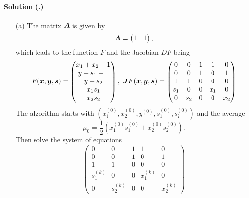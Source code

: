 \documentclass{article}
\newcounter{problemSheetNumber}
\newcounter{problems}
\renewcommand{\solution}[1]{\paragraph{Solution (\theproblemSheetNumber.\theproblems)}\addtocounter{problems}{1}\label{#1}}
\begin{document}
\solution{pr:2} \begin{itemize} \item[(a)] The matrix $\bm{A}$ is given by
\begin{equation*}
 \bm{A} = \begin{pmatrix} 1 & 1 \end{pmatrix},
\end{equation*}
which leads to the function $F$ and the Jacobian $DF$ being
\begin{equation*}
 F(\vct{x},\vct{y},\vct{s}) = \begin{pmatrix}
                               x_1+x_2-1\\
                               y +s_1-1\\
                               y+s_2\\
                               x_1s_1\\
                               x_2s_2
                              \end{pmatrix}, \ 
 \mtx{J}F(\vct{x},\vct{y},\vct{s}) = \begin{pmatrix} 
                               0 & 0 & 1 & 1 & 0\\
                               0 & 0 & 1 & 0 & 1\\
                               1 & 1 & 0 & 0 & 0\\
                               s_1 & 0 & 0 & x_1 & 0\\
                               0 & s_2 & 0 & 0 & x_2
                              \end{pmatrix}
\end{equation*}
The algorithm starts with $(x_1^{(0)},x_2^{(0)},y^{(0)},s_1^{(0)},s_2^{(0)})$ and the average
\begin{equation*}
 \mu_0 = \frac{1}{2}(x_1^{(0)}s_1^{(0)}+x_2^{(0)}s_2^{(0)}).
\end{equation*}
Then solve the system of equations
\begin{equation*}
 \begin{pmatrix} 
                               0 & 0 & 1 & 1 & 0\\
                               0 & 0 & 1 & 0 & 1\\
                               1 & 1 & 0 & 0 & 0\\
                               s^{(k)}_1 & 0 & 0 & x^{(k)}_1 & 0\\
                               0 & s^{(k)}_2 & 0 & 0 & x^{(k)}_2
                              \end{pmatrix} 

\end{equation*}
\end{itemize}
\end{document}
